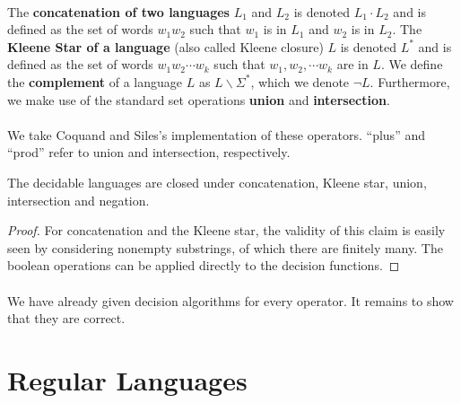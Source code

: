     \paragraph{}

    The \textbf{concatenation of two languages} $L_1$ and $L_2$ is denoted $L_1 \cdot L_2$ and is defined as the set of words $w_1 w_2$ such that $w_1$ is in $L_1$ and $w_2$ is in $L_2$.
    The \textbf{Kleene Star of a language} (also called Kleene closure) $L$ is denoted $L^*$ and is defined as the set of words $w_1 w_2 \cdots w_k$ such that $w_1, w_2, \cdots w_k$ are in $L$.
    We define the \textbf{complement} of a language $L$ as $L \backslash \Sigma^*$, which we denote $\neg L$.
    Furthermore, we make use of the standard set operations \textbf{union} and \textbf{intersection}.

    \paragraph{}
    We take Coquand and Siles's \cite{DBLP:conf/cpp/CoquandS11} implementation of these operators. ``plus'' and ``prod'' refer to union and intersection, respectively.


    \begin{theorem}{}
        \label{DecLangClosed}
        The decidable languages are closed under concatenation, Kleene star, union, intersection and negation. 
    \end{theorem}
    \begin{proof}
        For concatenation and the Kleene star, the validity of this claim is easily seen by considering nonempty substrings, of which there are finitely many. 
        The boolean operations can be applied directly to the decision functions.
    \end{proof}

    \paragraph{}
    We have already given decision algorithms for every operator. 
    It remains to show that they are correct.








    \section{Regular Languages}


